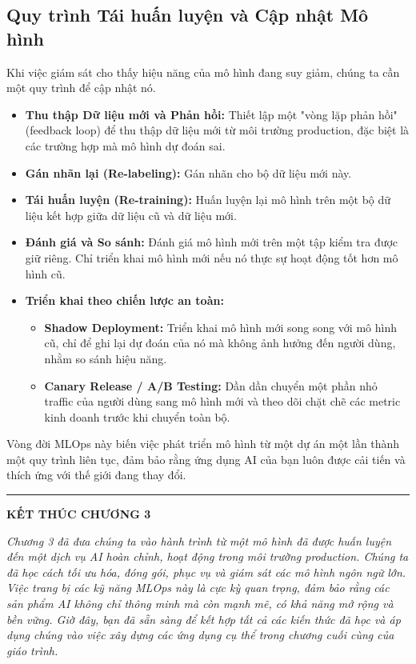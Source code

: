 \subsection{Quy trình Tái huấn luyện và Cập nhật Mô hình}
\label{ssec:retraining_pipeline}
Khi việc giám sát cho thấy hiệu năng của mô hình đang suy giảm, chúng ta cần một quy trình để cập nhật nó.
\begin{itemize}
    \item \textbf{Thu thập Dữ liệu mới và Phản hồi:} Thiết lập một "vòng lặp phản hồi" (feedback loop) để thu thập dữ liệu mới từ môi trường production, đặc biệt là các trường hợp mà mô hình dự đoán sai.
    \item \textbf{Gán nhãn lại (Re-labeling):} Gán nhãn cho bộ dữ liệu mới này.
    \item \textbf{Tái huấn luyện (Re-training):} Huấn luyện lại mô hình trên một bộ dữ liệu kết hợp giữa dữ liệu cũ và dữ liệu mới.
    \item \textbf{Đánh giá và So sánh:} Đánh giá mô hình mới trên một tập kiểm tra được giữ riêng. Chỉ triển khai mô hình mới nếu nó thực sự hoạt động tốt hơn mô hình cũ.
    \item \textbf{Triển khai theo chiến lược an toàn:}
        \begin{itemize}
            \item \textbf{Shadow Deployment:} Triển khai mô hình mới song song với mô hình cũ, chỉ để ghi lại dự đoán của nó mà không ảnh hưởng đến người dùng, nhằm so sánh hiệu năng.
            \item \textbf{Canary Release / A/B Testing:} Dần dần chuyển một phần nhỏ traffic của người dùng sang mô hình mới và theo dõi chặt chẽ các metric kinh doanh trước khi chuyển toàn bộ.
        \end{itemize}
\end{itemize}
Vòng đời MLOps này biến việc phát triển mô hình từ một dự án một lần thành một quy trình liên tục, đảm bảo rằng ứng dụng AI của bạn luôn được cải tiến và thích ứng với thế giới đang thay đổi.

\bigskip
\hrule
\bigskip

\begin{center}
    \textbf{\Large KẾT THÚC CHƯƠNG 3}
\end{center}
\textit{Chương 3 đã đưa chúng ta vào hành trình từ một mô hình đã được huấn luyện đến một dịch vụ AI hoàn chỉnh, hoạt động trong môi trường production. Chúng ta đã học cách tối ưu hóa, đóng gói, phục vụ và giám sát các mô hình ngôn ngữ lớn. Việc trang bị các kỹ năng MLOps này là cực kỳ quan trọng, đảm bảo rằng các sản phẩm AI không chỉ thông minh mà còn mạnh mẽ, có khả năng mở rộng và bền vững. Giờ đây, bạn đã sẵn sàng để kết hợp tất cả các kiến thức đã học và áp dụng chúng vào việc xây dựng các ứng dụng cụ thể trong chương cuối cùng của giáo trình.}